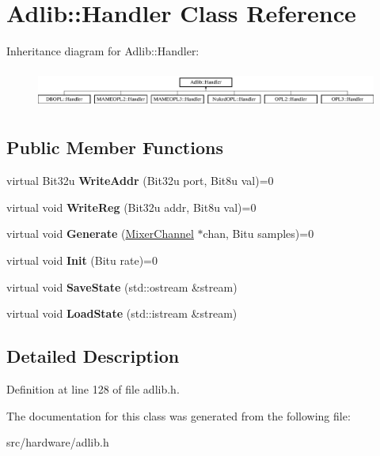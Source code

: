 \hypertarget{classAdlib_1_1Handler}{\section{Adlib\-:\-:Handler Class Reference}
\label{classAdlib_1_1Handler}
}
Inheritance diagram for Adlib\-:\-:Handler\-:\begin{figure}[H]
\begin{center}
\leavevmode
\includegraphics[height=1.314554cm]{classAdlib_1_1Handler}
\end{center}
\end{figure}
\subsection*{Public Member Functions}
\begin{DoxyCompactItemize}
\item 
\hypertarget{classAdlib_1_1Handler_aecfd94a9fc9c688bdb4029610f12cc8f}{virtual Bit32u {\bfseries Write\-Addr} (Bit32u port, Bit8u val)=0}\label{classAdlib_1_1Handler_aecfd94a9fc9c688bdb4029610f12cc8f}

\item 
\hypertarget{classAdlib_1_1Handler_a002f7eb216a517e9e1afa258fd9646fc}{virtual void {\bfseries Write\-Reg} (Bit32u addr, Bit8u val)=0}\label{classAdlib_1_1Handler_a002f7eb216a517e9e1afa258fd9646fc}

\item 
\hypertarget{classAdlib_1_1Handler_a1bde8d54a3e567e256b969c5ae1c3e3c}{virtual void {\bfseries Generate} (\hyperlink{classMixerChannel}{Mixer\-Channel} $\ast$chan, Bitu samples)=0}\label{classAdlib_1_1Handler_a1bde8d54a3e567e256b969c5ae1c3e3c}

\item 
\hypertarget{classAdlib_1_1Handler_acfb5d8e5e01a30b2ffb6efe99be71844}{virtual void {\bfseries Init} (Bitu rate)=0}\label{classAdlib_1_1Handler_acfb5d8e5e01a30b2ffb6efe99be71844}

\item 
\hypertarget{classAdlib_1_1Handler_a0c653d11d2cb950204a57823f39d2826}{virtual void {\bfseries Save\-State} (std\-::ostream \&stream)}\label{classAdlib_1_1Handler_a0c653d11d2cb950204a57823f39d2826}

\item 
\hypertarget{classAdlib_1_1Handler_acd9c854d70a612ae53c5c353995347f0}{virtual void {\bfseries Load\-State} (std\-::istream \&stream)}\label{classAdlib_1_1Handler_acd9c854d70a612ae53c5c353995347f0}

\end{DoxyCompactItemize}


\subsection{Detailed Description}


Definition at line 128 of file adlib.\-h.



The documentation for this class was generated from the following file\-:\begin{DoxyCompactItemize}
\item 
src/hardware/adlib.\-h\end{DoxyCompactItemize}
